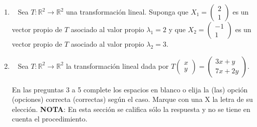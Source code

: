 \documentclass[11pt]{article}
\newcommand{\ptsbox}[1]{\fbox{\footnotesize #1}~}
\newcommand{\vect}[2]{\begin{pmatrix}#1\\#2\end{pmatrix}}
\newcommand{\examheader}{%
  \noindent
  \begin{minipage}[t]{0.6\linewidth}
    {\small\bfseries Geometría Vectorial y Analítica --- Parcial 2}\\
    {\small Semestre 2016--01}
  \end{minipage}%
  \hfill
  \begin{minipage}[t]{0.35\linewidth}
    \raggedleft\small Escuela de Matemáticas. Universidad Nacional de Colombia, Sede Medellín.
  \end{minipage}\\[2pt]
  \rule{\linewidth}{0.6pt}
}
\begin{document}
\begin{enumerate}[leftmargin=1.6em]

\item \ptsbox{20pt} Sea $T:\mathbb{R}^2\to\mathbb{R}^2$ una transformación lineal. Suponga que $X_1 = \vect{2}{1}$ es un vector propio de $T$ asociado al valor propio $\lambda_1 = 2$ y que $X_2 = \vect{-1}{1}$ es un vector propio de $T$ asociado al valor propio $\lambda_2 = 3$.


\item \ptsbox{30pt} Sea $T:\mathbb{R}^2\to\mathbb{R}^2$ la transformación lineal dada por $T\vect{x}{y} = \vect{3x+y}{7x+2y}$.


\vspace{10pt}
En las preguntas 3 a 5 complete los espacios en blanco o elija la (las) opción (opciones) correcta (correctas) según el caso. Marque con una X la letra de su elección. \textbf{NOTA}: En esta sección se califica sólo la respuesta y no se tiene en cuenta el procedimiento.


\end{enumerate}
\end{document}
